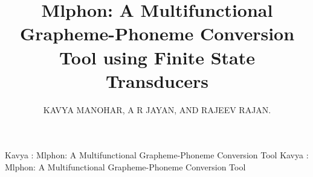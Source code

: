 \documentclass{ieeeaccess}
\begin{document}

\title{Mlphon: A Multifunctional Grapheme-Phoneme Conversion Tool using Finite State Transducers}
\author{\uppercase{Kavya Manohar}, %
\uppercase{A R Jayan, and Rajeev Rajan}.
}
\address[1]{%
College of Engineering Trivandrum,
Kerala - 695 586 India}
\address[2]{Government Engineering College, Thrissur, Kerala, India}
\address[3]{APJ Abdul Kalam Technological University, Kerala, India }

\markboth
{Kavya \headeretal: Mlphon: A Multifunctional Grapheme-Phoneme Conversion Tool}
{Kavya \headeretal: Mlphon: A Multifunctional Grapheme-Phoneme Conversion Tool}

\end{document}
